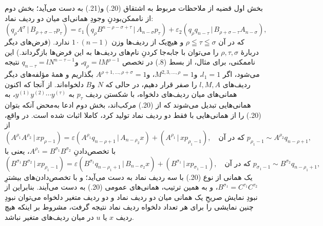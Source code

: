 \documentclass[11pt]{article}
\providecommand{\pair}[2]{(#1\,|\,#2)}
\providecommand{\eps}{\varepsilon}
\begin{document}
بخش اول قضیه از ملاحظات مربوط به اشتقاق (20.) و(21.) به دست می‌آید؛ بخش دوم از ناممکن‌بودنِ وجودِ همانی‌ای میان دو ردیف نماد:
\[
\pair{q_\rho A^\sigma}{B_{\rho+\sigma-\tau}p_\tau}
=\eps_1\pair{q_\rho B^{n-\rho-\sigma+\tau}}{A_{n-\sigma}p_\tau}
+\eps_2\pair{q_\rho q_{n-\tau}}{B_{\rho+\sigma-\tau}A_{n-\sigma}},
\]
که در آن $\rho\leqq\tau\leqq\sigma$ و هیچ‌یک از ردیف‌ها وزن $1\cdot(n-1)$ ندارد. (فرض‌های دیگر دربارهٔ $\rho,\tau,\sigma$ را می‌توان با جابه‌جا کردنِ نام‌های ردیف‌ها به این فرض‌ها بازگرداند.) این ناممکنی، برای مثال، از بسط (8.) در تخصص $q_\rho=lM^{\rho-1}$، و$q_{n-\tau}=lN^{n-\tau-1}$ نتیجه می‌شود، اگر $l_1=1$، و$M^{2,3,\ldots,\rho}=1$، و$A^{\rho+1,\ldots,\rho+\sigma}=1$ بگذاریم و همهٔ مؤلفه‌های دیگر ردیف‌های $l,M,A$ را صفر قرار دهیم، در حالی که $N$ و$B$ دلخواه‌اند. از آنجا که اکنون همانی‌های میان ردیف‌های دلخواه، با شکستن ردیف $p_\tau$ به $y^{(1)}y^{(2)}\cdots y^{(\tau)}$، به همانی‌هایی تبدیل می‌شوند که از (20.) مرکب‌اند، بخش دوم ادعا به‌محض آنکه بتوان (20.) را از همانی‌هایی با فقط دو ردیف نماد تولید کرد، کاملا اثبات شده است. در واقع، از
\begin{equation}
\pair{A^{\rho_1}A^{\rho_2}}{xp_{\rho-1}}
=\eps\pair{A^{\rho_1}q_{n-\rho+1}}{A_{n-\rho_2}x}
+\pair{A^{\rho_1}}{xp_{\rho_1-1}},
\quad \text{که در آن }p_{\rho_1-1}\sim A^{\rho_2}q_{n-\rho+1},
\tag{20a}
\end{equation}
با تخصص‌دادنِ $A^{\rho_1}=B^{\sigma_1}B^{\sigma_2}$، یعنی با
\[
\pair{B^{\sigma_1}B^{\sigma_2}}{xp_{\rho_1-1}}
=\eps\pair{B^{\sigma_1}q_{n-\rho_1+1}}{B_{n-\sigma_2}x}
+\pair{B^{\sigma_1}}{xp_{\sigma_1-1}},
\quad \text{که در آن } p_{\sigma_1-1}\sim B^{\sigma_2}q_{n-\rho_1+1},
\]
یک همانی از نوع (20.) با سه ردیف نماد به دست می‌آید؛ و با تخصص‌دادن‌های بیشترِ $B^{\sigma_1}=C^{\tau_1}C^{\tau_2}$، و به همین ترتیب، همانی‌های عمومی (20.) به دست می‌آیند. بنابراین از نبودِ نمایش صریحِ یک همانی میان دو ردیف نماد و دو ردیف متغیر دلخواه می‌توان نبودِ چنین نمایشی را برای هر تعداد دلخواه ردیف نماد نتیجه گرفت، مشروط بر اینکه هیچ ردیف $x$ یا $u$ در میان ردیف‌های متغیر نباشد.

\clearpage
\end{document}
